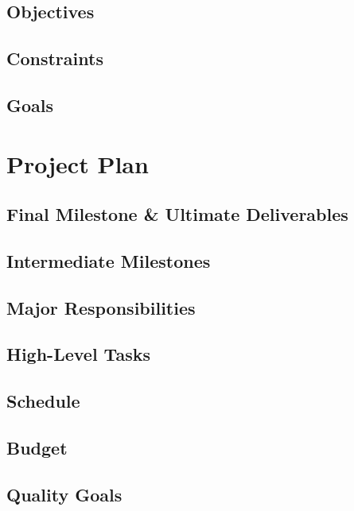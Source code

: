 \documentclass[10pt,letterpaper]{article}
\begin{document}
\subsection{Objectives}


\subsection{Constraints}


\subsection{Goals}


\section{Project Plan}


\subsection{Final Milestone \& Ultimate Deliverables}


\subsection{Intermediate Milestones}


\subsection{Major Responsibilities}


\subsection{High-Level Tasks}


\subsection{Schedule}


\subsection{Budget}


\subsection{Quality Goals}

\end{document}
